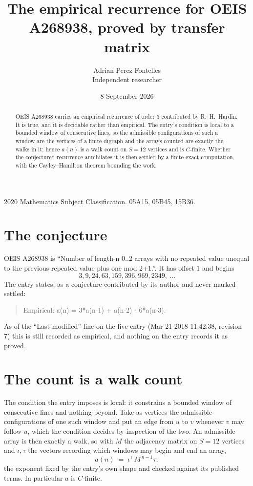 \documentclass[11pt,a4paper]{article}
\title{The empirical recurrence for OEIS A268938, proved by transfer matrix}
\author{Adrian Perez Fontelles\\ \small Independent researcher}
\date{8 September 2026}
\theoremstyle{plain}
\theoremstyle{definition}
\begin{document}
\maketitle

\begin{abstract}
OEIS A268938 carries an empirical recurrence of order $3$ contributed by R.~H.~Hardin. It is
true, and it is decidable rather than empirical. The entry's condition is local to a bounded window of consecutive lines, so
the admissible configurations of such a window are the vertices of a finite digraph and the
arrays counted are exactly the walks in it; hence $a(n)$ is a walk count on $S=12$ vertices
and is $C$-finite. Whether the conjectured recurrence annihilates it is then settled by a
finite exact computation, with the Cayley--Hamilton theorem bounding the work.
\end{abstract}

\noindent\small 2020 Mathematics Subject Classification. 05A15, 05B45, 15B36.\normalsize

\section{The conjecture}

OEIS A268938 is ``Number of length-n 0..2 arrays with no repeated value unequal to the previous repeated value plus one mod 2+1.''. It has offset $1$ and begins
\[
3, 9, 24, 63, 159, 396, 969, 2349,\ \dots
\]
The entry states, as a conjecture contributed by its author and never marked settled:
\begin{quote}
Empirical: a(n) = 3*a(n-1) + a(n-2) - 6*a(n-3).
\end{quote}
As of the ``Last modified'' line on the live entry (Mar 21 2018 11:42:38, revision 7) this is still
recorded as empirical, and nothing on the entry records it as proved.

\section{The count is a walk count}

The condition the entry imposes is local: it constrains a bounded window of consecutive lines and nothing beyond. Take as
vertices the admissible configurations of one such window and put an edge from $u$ to $v$
whenever $v$ may follow $u$, which the condition decides by inspection of the two. An
admissible array is then exactly a walk, so with $M$ the adjacency matrix on $S=12$ vertices
and $\iota,\tau$ the vectors recording which windows may begin and end an array,
\[
a(n)\;=\;\iota^{\!\top}M^{\,n-1}\tau ,
\]
the exponent fixed by the entry's own shape and checked against its published terms. In
particular $a$ is $C$-finite.
\end{document}
